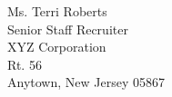 \documentclass{letter} 					%
\begin{document}
\begin{letter}{
		Ms. Terri Roberts \\
		Senior Staff Recruiter \\
		XYZ Corporation \\
		Rt. 56 \\
		Anytown, New Jersey 05867
		}
%
%
%
%
%
%
%


%
% 
% 


\end{letter}
 
\end{document}

